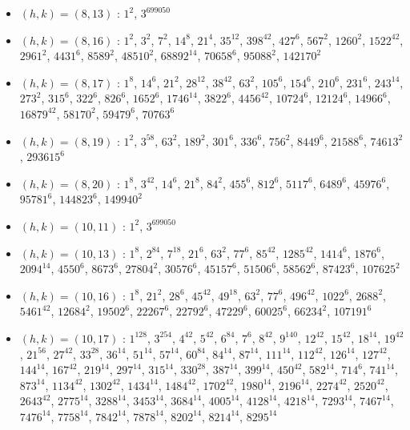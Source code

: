 \begin{itemize}
\item $(h,k)=(8,13)$ : $1^{2}$, $3^{699050}$
\item $(h,k)=(8,16)$ : $1^{2}$, $3^{2}$, $7^{2}$, $14^{8}$, $21^{4}$, $35^{12}$, $398^{42}$, $427^{6}$, $567^{2}$, $1260^{2}$, $1522^{42}$, $2961^{2}$, $4431^{6}$, $8589^{2}$, $48510^{2}$, $68892^{14}$, $70658^{6}$, $95088^{2}$, $142170^{2}$
\item $(h,k)=(8,17)$ : $1^{8}$, $14^{6}$, $21^{2}$, $28^{12}$, $38^{42}$, $63^{2}$, $105^{6}$, $154^{6}$, $210^{6}$, $231^{6}$, $243^{14}$, $273^{2}$, $315^{6}$, $322^{6}$, $826^{6}$, $1652^{6}$, $1746^{14}$, $3822^{6}$, $4456^{42}$, $10724^{6}$, $12124^{6}$, $14966^{6}$, $16879^{42}$, $58170^{2}$, $59479^{6}$, $70763^{6}$
\item $(h,k)=(8,19)$ : $1^{2}$, $3^{58}$, $63^{2}$, $189^{2}$, $301^{6}$, $336^{6}$, $756^{2}$, $8449^{6}$, $21588^{6}$, $74613^{2}$, $293615^{6}$
\item $(h,k)=(8,20)$ : $1^{8}$, $3^{42}$, $14^{6}$, $21^{8}$, $84^{2}$, $455^{6}$, $812^{6}$, $5117^{6}$, $6489^{6}$, $45976^{6}$, $95781^{6}$, $144823^{6}$, $149940^{2}$
\item $(h,k)=(10,11)$ : $1^{2}$, $3^{699050}$
\item $(h,k)=(10,13)$ : $1^{8}$, $2^{84}$, $7^{18}$, $21^{6}$, $63^{2}$, $77^{6}$, $85^{42}$, $1285^{42}$, $1414^{6}$, $1876^{6}$, $2094^{14}$, $4550^{6}$, $8673^{6}$, $27804^{2}$, $30576^{6}$, $45157^{6}$, $51506^{6}$, $58562^{6}$, $87423^{6}$, $107625^{2}$
\item $(h,k)=(10,16)$ : $1^{8}$, $21^{2}$, $28^{6}$, $45^{42}$, $49^{18}$, $63^{2}$, $77^{6}$, $496^{42}$, $1022^{6}$, $2688^{2}$, $5461^{42}$, $12684^{2}$, $19502^{6}$, $22267^{6}$, $22792^{6}$, $47229^{6}$, $60025^{6}$, $66234^{2}$, $107191^{6}$
\item $(h,k)=(10,17)$ : $1^{128}$, $3^{254}$, $4^{42}$, $5^{42}$, $6^{84}$, $7^{6}$, $8^{42}$, $9^{140}$, $12^{42}$, $15^{42}$, $18^{14}$, $19^{42}$, $21^{56}$, $27^{42}$, $33^{28}$, $36^{14}$, $51^{14}$, $57^{14}$, $60^{84}$, $84^{14}$, $87^{14}$, $111^{14}$, $112^{42}$, $126^{14}$, $127^{42}$, $144^{14}$, $167^{42}$, $219^{14}$, $297^{14}$, $315^{14}$, $330^{28}$, $387^{14}$, $399^{14}$, $450^{42}$, $582^{14}$, $714^{6}$, $741^{14}$, $873^{14}$, $1134^{42}$, $1302^{42}$, $1434^{14}$, $1484^{42}$, $1702^{42}$, $1980^{14}$, $2196^{14}$, $2274^{42}$, $2520^{42}$, $2643^{42}$, $2775^{14}$, $3288^{14}$, $3453^{14}$, $3684^{14}$, $4005^{14}$, $4128^{14}$, $4218^{14}$, $7293^{14}$, $7467^{14}$, $7476^{14}$, $7758^{14}$, $7842^{14}$, $7878^{14}$, $8202^{14}$, $8214^{14}$, $8295^{14}$

\end{itemize}
